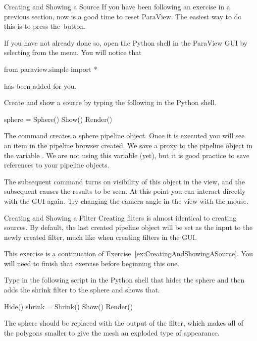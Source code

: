 \begin{exercise}{Creating and Showing a Source}
  \label{ex:CreatingAndShowingASource}%
  If you have been following an exercise in a previous section, now is a
  good time to reset ParaView.  The easiest way to do this is to press
  the~\disconnect button.

  If you have not already done so, open the Python shell in the ParaView
  GUI by selecting  \ra {} from the menu.  You
  will notice that
  \begin{python}
from paraview.simple import *
  \end{python}
  has been added for you.

  Create and show a  source by typing the following in the
  Python shell.
  \begin{python}
sphere = Sphere()
Show()
Render()
  \end{python}

  The  command creates a sphere pipeline object.  Once it is
  executed you will see an item in the pipeline browser created.  We save a
  proxy to the pipeline object in the variable .  We are
  not using this variable (yet), but it is good practice to save references
  to your pipeline objects.

  The subsequent  command turns on visibility of this object in
  the view, and the subsequent  causes the results to be
  seen.  At this point you can interact directly with the GUI again.  Try
  changing the camera angle in the view with the mouse.
\end{exercise}

\begin{exercise}{Creating and Showing a Filter}
  \label{ex:CreatingAndShowingAFilter}%
  Creating filters is almost identical to creating sources.  By default,
  the last created pipeline object will be set as the input to the newly
  created filter, much like when creating filters in the GUI.

  This exercise is a continuation of
  Exercise~\ref{ex:CreatingAndShowingASource}.  You will need to finish
  that exercise before beginning this one.

  Type in the following script in the Python shell that hides the sphere
  and then adds the shrink filter to the sphere and shows that.

  \begin{python}
Hide()
shrink = Shrink()
Show()
Render()
  \end{python}

  The sphere should be replaced with the output of the 
  filter, which makes all of the polygons smaller to give the mesh an
  exploded type of appearance.
\end{exercise}

